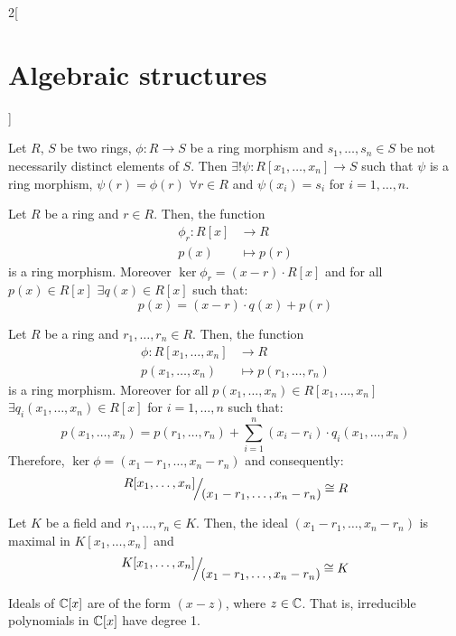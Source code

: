 \documentclass[../../../main.tex]{subfiles}
\begin{document}
\begin{multicols}{2}[\section{Algebraic structures}]
\begin{prop}
\begin{center}
\begin{minipage}{\linewidth}
                \label{AS_theorem3}
            \end{minipage}
        \end{center}
    \end{prop}
    \begin{prop}
        Let $R$, $S$ be two rings, $\phi:R\rightarrow S$ be a ring morphism and $s_1,\ldots,s_n\in S$ be not necessarily distinct elements of $S$. Then $\exists!\psi:R[x_1,\ldots,x_n]\rightarrow S$ such that $\psi$ is a ring morphism, $\psi(r)=\phi(r)$ $\forall r\in R$ and $\psi(x_i)=s_i$ for $i=1,\ldots,n$.
    \end{prop}
    \begin{corollary}
        Let $R$ be a ring and $r\in R$. Then, the function
        \begin{align*}
            \phi_r:R[x] & \longrightarrow R \\
            p(x)        & \longmapsto p(r)
        \end{align*}
        is a ring morphism. Moreover $\ker\phi_r=(x-r)\cdot R[x]$ and for all $p(x)\in R[x]$ $\exists q(x)\in R[x]$ such that: $$p(x)=(x-r)\cdot q(x)+p(r)$$
    \end{corollary}
    \begin{corollary}
        Let $R$ be a ring and $r_1,\ldots,r_n\in R$. Then, the function
        \begin{align*}
            \phi:R[x_1,\ldots,x_n] & \longrightarrow R             \\
            p(x_1,\ldots,x_n)      & \longmapsto p(r_1,\ldots,r_n)
        \end{align*}
        is a ring morphism. Moreover for all $p(x_1,\ldots,x_n)\in R[x_1,\ldots,x_n]$ $\exists q_i(x_1,\ldots,x_n)\in R[x]$ for $i=1,\ldots,n$ such that: $$p(x_1,\ldots,x_n)=p(r_1,\ldots,r_n)+\sum_{i=1}^n(x_i-r_i)\cdot q_i(x_1,\ldots,x_n)$$ Therefore, $\ker\phi=(x_1-r_1,\ldots,x_n-r_n)$ and consequently: $$\quot{R[x_1,\ldots,x_n]}{(x_1-r_1,\ldots,x_n-r_n)}\cong R$$
    \end{corollary}
    \begin{corollary}
        Let $K$ be a field and $r_1,\ldots,r_n\in K$. Then, the ideal $(x_1-r_1,\ldots,x_n-r_n)$ is maximal in $K[x_1,\ldots,x_n]$ and $$\quot{K[x_1,\ldots,x_n]}{(x_1-r_1,\ldots,x_n-r_n)}\cong K$$
    \end{corollary}
    \begin{theorem}
        Ideals of $\mathbb{C}[x]$ are of the form $(x-z)$, where $z\in\mathbb{C}$. That is, irreducible polynomials in $\mathbb{C}[x]$ have degree 1.

\end{theorem}
\end{multicols}
\end{document}
